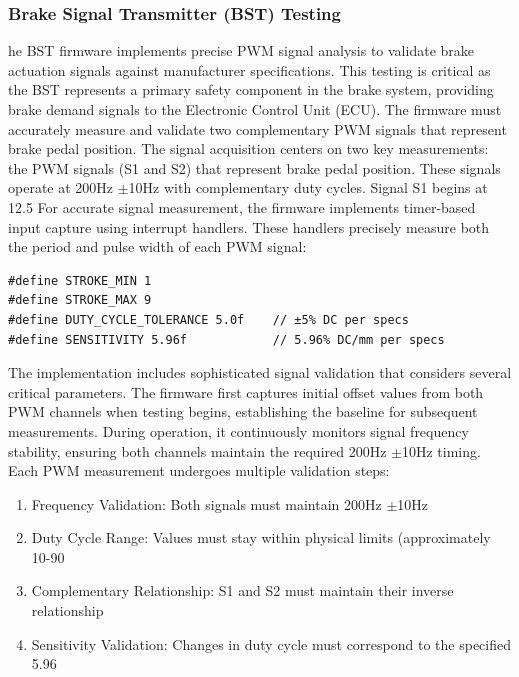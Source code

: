 \documentclass[12pt]{article}
\begin{document}
\subsubsection{Brake Signal Transmitter (BST) Testing}

he BST firmware implements precise PWM signal analysis to validate brake actuation signals against manufacturer specifications. This testing is critical as the BST represents a primary safety component in the brake system, providing brake demand signals to the Electronic Control Unit (ECU). The firmware must accurately measure and validate two complementary PWM signals that represent brake pedal position.
The signal acquisition centers on two key measurements: the PWM signals (S1 and S2) that represent brake pedal position. These signals operate at 200Hz $\pm$10Hz with complementary duty cycles. Signal S1 begins at 12.5%
For accurate signal measurement, the firmware implements timer-based input capture using interrupt handlers. These handlers precisely measure both the period and pulse width of each PWM signal:
\begin{verbatim}
#define STROKE_MIN 1
#define STROKE_MAX 9
#define DUTY_CYCLE_TOLERANCE 5.0f    // ±5% DC per specs
#define SENSITIVITY 5.96f            // 5.96% DC/mm per specs
\end{verbatim}
The implementation includes sophisticated signal validation that considers several critical parameters. The firmware first captures initial offset values from both PWM channels when testing begins, establishing the baseline for subsequent measurements. During operation, it continuously monitors signal frequency stability, ensuring both channels maintain the required 200Hz $\pm$10Hz timing. Each PWM measurement undergoes multiple validation steps:
\begin{enumerate}
\item Frequency Validation: Both signals must maintain 200Hz $\pm$10Hz
\item Duty Cycle Range: Values must stay within physical limits (approximately 10-90%
\item Complementary Relationship: S1 and S2 must maintain their inverse relationship
\item Sensitivity Validation: Changes in duty cycle must correspond to the specified 5.96%
\end{enumerate}
\end{document}
